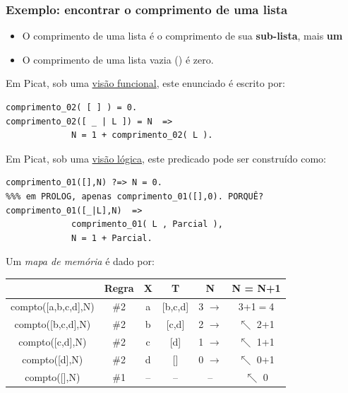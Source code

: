 \begin{frame}[fragile, allowframebreaks=0.9]
\frametitle{Exemplo: encontrar o comprimento de uma lista}
 
\begin{itemize}
   \item O comprimento de uma lista é o comprimento de sua \textbf{sub-lista}, mais \textbf{um}
   \item O comprimento de uma lista vazia (\lbrack  \rbrack) é zero.
 \end{itemize} 
 
Em Picat, sob uma \underline{visão funcional}, este enunciado é escrito por:

\begin{verbatim}
comprimento_02( [ ] ) = 0.
comprimento_02([ _ | L ]) = N  => 
             N = 1 + comprimento_02( L ).
\end{verbatim}

\framebreak

Em Picat, sob uma \underline{visão lógica}, este predicado 
pode ser construído como:

\begin{verbatim}
comprimento_01([],N) ?=> N = 0. 
%%% em PROLOG, apenas comprimento_01([],0). PORQUÊ?
comprimento_01([_|L],N)  => 
             comprimento_01( L , Parcial ), 
             N = 1 + Parcial.
\end{verbatim}

\framebreak
Um {\em mapa de memória} é dado por:

\begin{center}
\begin{tabular}[c]{|c|c|c|c|c|c|}
\hline
& Regra & X & T & N & N = N+1\\\hline
compto([a,b,c,d],N) & \#2 & a & [b,c,d] & 3 $\rightarrow$ & 3+1$=$4\\\hline
compto([b,c,d],N) & \#2 & b & [c,d] & 2 $\rightarrow$ & $\nwarrow$ 2+1\\\hline
compto([c,d],N) & \#2 & c & [d] & 1 $\rightarrow$ & $\nwarrow$ 1+1\\\hline
compto([d],N) & \#2 & d & [] & 0 $\rightarrow$ & $\nwarrow$ 0+1\\\hline
compto([],N) & \#1 & -- & -- & -- & $\nwarrow$ 0\\\hline
\end{tabular}
\end{center}
 
 \end{frame}

